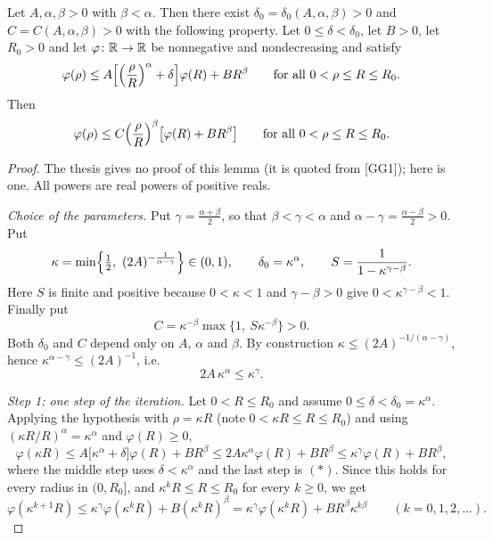 \begin{lemma}[Lemma 4.3]
Let $A,\alpha,\beta>0$ with $\beta<\alpha$.  Then there exist
$\delta_0=\delta_0(A,\alpha,\beta)>0$ and $C=C(A,\alpha,\beta)>0$ with the
following property.  Let $0\le\delta<\delta_0$, let $B>0$, let $R_0>0$ and let
$\varphi\colon\mathbb{R}\to\mathbb{R}$ be nonnegative and nondecreasing and satisfy
\[
\varphi(\rho)\le A\Bigl[\Bigl(\frac\rho R\Bigr)^{\alpha}+\delta\Bigr]\varphi(R)+BR^{\beta}
\qquad\text{for all }0<\rho\le R\le R_0 .
\]
Then
\[
\varphi(\rho)\le C\Bigl(\frac\rho R\Bigr)^{\beta}\bigl[\varphi(R)+BR^{\beta}\bigr]
\qquad\text{for all }0<\rho\le R\le R_0 .
\]
\end{lemma}
\begin{proof}
The thesis gives no proof of this lemma (it is quoted from [GG1]); here is one.
All powers are real powers of positive reals.

\emph{Choice of the parameters.}  Put $\gamma=\frac{\alpha+\beta}2$, so that
$\beta<\gamma<\alpha$ and $\alpha-\gamma=\frac{\alpha-\beta}2>0$.  Put
\[
\kappa=\min\Bigl\{\tfrac12,\ (2A)^{-\frac1{\alpha-\gamma}}\Bigr\}\in(0,1),
\qquad \delta_0=\kappa^{\alpha},
\qquad
S=\frac1{1-\kappa^{\gamma-\beta}} .
\]
Here $S$ is finite and positive because $0<\kappa<1$ and $\gamma-\beta>0$ give
$0<\kappa^{\gamma-\beta}<1$.  Finally put
\[
C=\kappa^{-\beta}\max\{1,\ S\kappa^{-\beta}\}>0 .
\]
Both $\delta_0$ and $C$ depend only on $A$, $\alpha$ and $\beta$.  By
construction $\kappa\le(2A)^{-1/(\alpha-\gamma)}$, hence
$\kappa^{\alpha-\gamma}\le(2A)^{-1}$, i.e.
\begin{equation}
2A\,\kappa^{\alpha}\le\kappa^{\gamma}. \tag{$*$}
\end{equation}

\emph{Step 1: one step of the iteration.}  Let $0<R\le R_0$ and assume
$0\le\delta<\delta_0=\kappa^{\alpha}$.  Applying the hypothesis with
$\rho=\kappa R$ (note $0<\kappa R\le R\le R_0$) and using
$(\kappa R/R)^{\alpha}=\kappa^{\alpha}$ and $\varphi(R)\ge0$,
\[
\varphi(\kappa R)\le A\bigl[\kappa^{\alpha}+\delta\bigr]\varphi(R)+BR^{\beta}
\le 2A\kappa^{\alpha}\varphi(R)+BR^{\beta}
\le\kappa^{\gamma}\varphi(R)+BR^{\beta},
\]
where the middle step uses $\delta<\kappa^{\alpha}$ and the last step is $(*)$.
Since this holds for every radius in $(0,R_0]$, and $\kappa^kR\le R\le R_0$ for
every $k\ge0$, we get
\begin{equation}
\varphi(\kappa^{k+1}R)\le\kappa^{\gamma}\varphi(\kappa^{k}R)+B(\kappa^{k}R)^{\beta}
=\kappa^{\gamma}\varphi(\kappa^{k}R)+BR^{\beta}\kappa^{k\beta}
\qquad(k=0,1,2,\dots). \tag{$**$}
\end{equation}


\end{proof}
